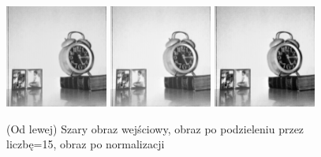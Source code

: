 \documentclass[final,a4paper,openany,12pt]{mwbk}
\begin{document}
\begin{figure}[H]
	\begin{center}
		\includegraphics[width=0.3\textwidth]{1/1Gray_Div_Original}
		\includegraphics[width=0.3\textwidth]{1/1Gray_Div_Result}
		\includegraphics[width=0.3\textwidth]{1/1Gray_Div_Result_Norm}
	\end{center}
	\caption{(Od lewej) Szary obraz wejściowy, obraz po podzieleniu przez liczbę=15, obraz po normalizacji }
\end{figure}
\end{document}
